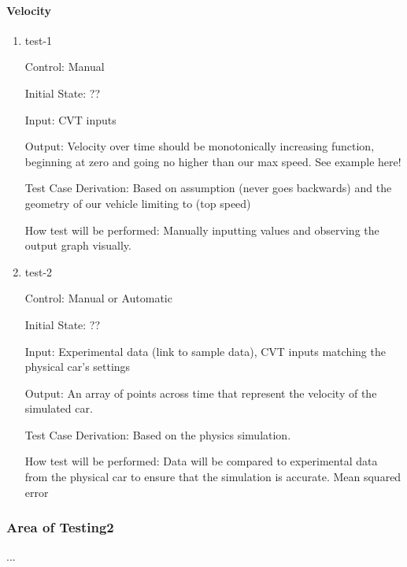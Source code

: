 \documentclass[12pt, titlepage]{article}
\begin{document}
\paragraph{Velocity}

\begin{enumerate}

\item{test-1\\}

Control: Manual
					
Initial State: ??
					
Input: CVT inputs
					
Output:  Velocity over time should be monotonically increasing function, beginning at zero and going no higher than our max speed. See example here!


Test Case Derivation: Based on assumption (never goes backwards) and the geometry of our vehicle limiting to (top speed)

					
How test will be performed: Manually inputting values and observing the output graph visually.
					
\item{test-2\\}

Control: Manual or Automatic

Initial State: ??

Input: Experimental data (link to sample data), CVT inputs matching the physical car's settings

Output: An array of points across time that represent the velocity of the simulated car.

Test Case Derivation: Based on the physics simulation.

How test will be performed: Data will be compared to experimental data from the physical car to ensure that the simulation is accurate. Mean squared error

\end{enumerate}

\subsubsection{Area of Testing2}

...
\end{document}
